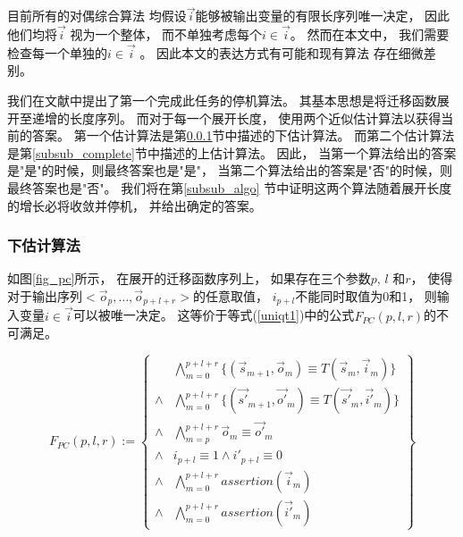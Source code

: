 目前所有的对偶综合算法
均假设$\vec{i}$能够被输出变量的有限长序列唯一决定，
因此他们均将$\vec{i}$ 视为一个整体，
而不单独考虑每个$i\in\vec{i}$。
然而在本文中，
我们需要检查每一个单独的$i\in\vec{i}$ 。
因此本文的表达方式有可能和现有算法
存在细微差别。

我们在文献中提出了第一个完成此任务的停机算法。
其基本思想是将迁移函数展开至递增的长度序列。
而对于每一个展开长度，
使用两个近似估计算法以获得当前的答案。
第一个估计算法是第\ref{subsub_sound}节中描述的下估计算法。
而第二个估计算法是第\ref{subsub_complete}节中描述的上估计算法。
因此，
当第一个算法给出的答案是"是"的时候，则最终答案也是"是"，
当第二个算法给出的答案是"否"的时候，则最终答案也是"否"。
我们将在第\ref{subsub_algo} 节中证明这两个算法随着展开长度的增长必将收敛并停机，
并给出确定的答案。

\subsubsection{下估计算法}\label{subsub_sound}

如图\ref{fig_pc}所示，
在展开的迁移函数序列上，
如果存在三个参数$p$, $l$ 和$r$，
使得对于输出序列$<\vec{o}_p,\dots,\vec{o}_{p+l+r}>$的任意取值，
$i_{p+l}$不能同时取值为0和1，
则输入变量$i\in\vec{i}$可以被唯一决定。
这等价于等式(\ref{uniqt1})中的公式$F_{PC}(p,l,r)$的不可满足。

\begin{equation}\label{uniqt1}
F_{PC}(p,l,r):=
\left\{
\begin{array}{cc}
&\bigwedge_{m=0}^{p+l+r}
\{
(\vec{s}_{m+1},\vec{o}_m)\equiv T(\vec{s}_m,\vec{i}_m)
\}
\\
\wedge&\bigwedge_{m=0}^{p+l+r}
\{
(\vec{s'}_{m+1},\vec{o'}_m)\equiv T(\vec{s'}_m,\vec{i'}_m)
\}
\\
\wedge&\bigwedge_{m=p}^{p+l+r}\vec{o}_m\equiv \vec{o'}_m \\
\wedge& i_{p+l}\equiv 1 \wedge  i'_{p+l}\equiv 0 \\
\wedge&\bigwedge_{m=0}^{p+l+r}assertion(\vec{i}_m) \\
\wedge&\bigwedge_{m=0}^{p+l+r}assertion(\vec{i'}_m)
\end{array}
\right\}
\end{equation}

